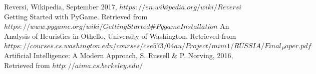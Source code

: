 \documentclass[letterpaper,12pt]{article}
\begin{document}
\begin{thebibliography}{}
\bibitem{}
Reversi, Wikipedia, September 2017, $https://en.wikipedia.org/wiki/Reversi$
\bibitem{}
Getting Started with PyGame. Retrieved from \\$https://www.pygame.org/wiki/GettingStarted\#Pygame Installation$
\bibitem{}
An Analysis of Heuristics in Othello, University of Washington. Retrieved from \\$https://courses.cs.washington.edu/courses/cse573/04au/Project/mini1/RUSSIA/Final_Paper.pdf$
\bibitem{}
Artificial Intelligence: A Modern Approach, S. Russell \& P. Norving, 2016, Retrieved from $http://aima.cs.berkeley.edu/$
\end{thebibliography}
\end{document}
